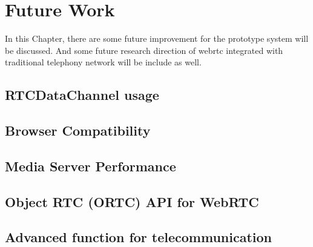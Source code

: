 \chapter{Future Work}
\label{chp:future_work}

\noindent In this Chapter, there are some future improvement for the prototype system will be discussed. And some future research direction of \gls{webrtc} integrated with traditional telephony network will be include as well.

\section{RTCDataChannel usage}

\section{Browser Compatibility}

\section{Media Server Performance}

\section{Object RTC (ORTC) API for WebRTC}

\section{Advanced function for telecommunication}